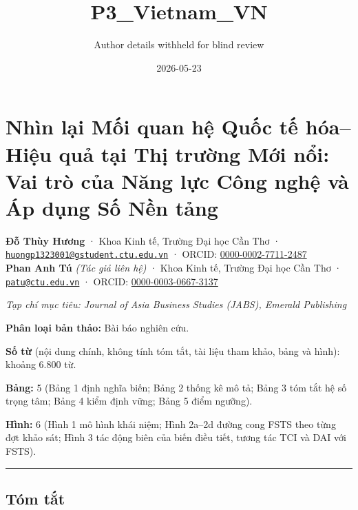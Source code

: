 \documentclass[12pt,a4paper]{article}
\title{P3\_Vietnam\_VN}
\author{Author details withheld for blind review}
\date{2026-05-23}
\begin{document}
\maketitle

\hypertarget{nhuxecn-lux1ea1i-mux1ed1i-quan-hux1ec7-quux1ed1c-tux1ebf-huxf3ahiux1ec7u-quux1ea3-tux1ea1i-thux1ecb-trux1b0ux1eddng-mux1edbi-nux1ed5i-vai-truxf2-cux1ee7a-nux103ng-lux1ef1c-cuxf4ng-nghux1ec7-vuxe0-uxe1p-dux1ee5ng-sux1ed1-nux1ec1n-tux1ea3ng}{%
\section{Nhìn lại Mối quan hệ Quốc tế hóa--Hiệu quả tại Thị trường Mới
nổi: Vai trò của Năng lực Công nghệ và Áp dụng Số Nền
tảng}\label{nhuxecn-lux1ea1i-mux1ed1i-quan-hux1ec7-quux1ed1c-tux1ebf-huxf3ahiux1ec7u-quux1ea3-tux1ea1i-thux1ecb-trux1b0ux1eddng-mux1edbi-nux1ed5i-vai-truxf2-cux1ee7a-nux103ng-lux1ef1c-cuxf4ng-nghux1ec7-vuxe0-uxe1p-dux1ee5ng-sux1ed1-nux1ec1n-tux1ea3ng}}

\textbf{Đỗ Thùy Hương} · Khoa Kinh tế, Trường Đại học Cần Thơ ·
\href{mailto:huongp1323001@gstudent.ctu.edu.vn}{\nolinkurl{huongp1323001@gstudent.ctu.edu.vn}}
· ORCID:
\href{https://orcid.org/0000-0002-7711-2487}{0000-0002-7711-2487}\\
\textbf{Phan Anh Tú} \emph{(Tác giả liên hệ)} · Khoa Kinh tế, Trường Đại
học Cần Thơ · \href{mailto:patu@ctu.edu.vn}{\nolinkurl{patu@ctu.edu.vn}}
· ORCID:
\href{https://orcid.org/0000-0003-0667-3137}{0000-0003-0667-3137}

\emph{Tạp chí mục tiêu: Journal of Asia Business Studies (JABS), Emerald
Publishing}

\textbf{Phân loại bản thảo:} Bài báo nghiên cứu.

\textbf{Số từ} (nội dung chính, không tính tóm tắt, tài liệu tham khảo,
bảng và hình): khoảng 6.800 từ.

\textbf{Bảng:} 5 (Bảng 1 định nghĩa biến; Bảng 2 thống kê mô tả; Bảng 3
tóm tắt hệ số trọng tâm; Bảng 4 kiểm định vững; Bảng 5 điểm ngưỡng).

\textbf{Hình:} 6 (Hình 1 mô hình khái niệm; Hình 2a--2d đường cong FSTS
theo từng đợt khảo sát; Hình 3 tác động biên của biến điều tiết, tương
tác TCI và DAI với FSTS).

\begin{center}\rule{0.5\linewidth}{0.5pt}\end{center}

\hypertarget{tuxf3m-tux1eaft}{%
\subsection{Tóm tắt}\label{tuxf3m-tux1eaft}}
\end{document}
